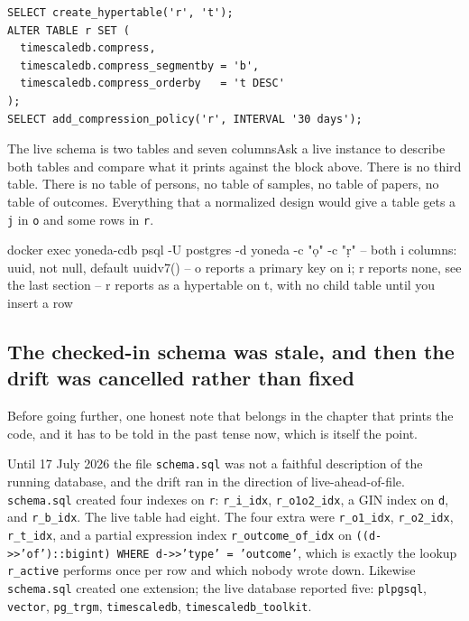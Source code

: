 \begin{lstlisting}
SELECT create_hypertable('r', 't');
ALTER TABLE r SET (
  timescaledb.compress,
  timescaledb.compress_segmentby = 'b',
  timescaledb.compress_orderby   = 't DESC'
);
SELECT add_compression_policy('r', INTERVAL '30 days');
\end{lstlisting}

\begin{Correspondence}{The live schema is two tables and seven columns}{Ask a live instance to describe both tables and compare what it prints against the block above.}
There is no third table. There is no table of persons, no table of samples, no table of papers, no table of outcomes. Everything that a normalized design would give a table gets a \texttt{j} in \texttt{o} and some rows in \texttt{r}.
\begin{Check}
docker exec yoneda-cdb psql -U postgres -d yoneda -c "\d o" -c "\d r"
-- both i columns: uuid, not null, default uuidv7()
-- o reports a primary key on i; r reports none, see the last section
-- r reports as a hypertable on t, with no child table until you insert a row
\end{Check}
\end{Correspondence}

\subsection{The checked-in schema was stale, and then the drift was cancelled rather than fixed}

Before going further, one honest note that belongs in the chapter that prints the code, and it has to be told in the past tense now, which is itself the point.

Until 17 July 2026 the file \texttt{schema.sql} was not a faithful description of the running database, and the drift ran in the direction of live-ahead-of-file. \texttt{schema.sql} created four indexes on \texttt{r}: \texttt{r\_i\_idx}, \texttt{r\_o1o2\_idx}, a GIN index on \texttt{d}, and \texttt{r\_b\_idx}. The live table had eight. The four extra were \texttt{r\_o1\_idx}, \texttt{r\_o2\_idx}, \texttt{r\_t\_idx}, and a partial expression index \texttt{r\_outcome\_of\_idx} on \texttt{((d->>'of')::bigint) WHERE d->>'type' = 'outcome'}, which is exactly the lookup \texttt{r\_active} performs once per row and which nobody wrote down. Likewise \texttt{schema.sql} created one extension; the live database reported five: \texttt{plpgsql}, \texttt{vector}, \texttt{pg\_trgm}, \texttt{timescaledb}, \texttt{timescaledb\_toolkit}.

